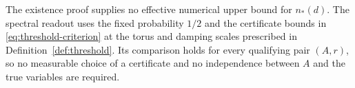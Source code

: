 The existence proof supplies no effective numerical upper bound for
$n_*(d)$. The spectral readout uses the fixed probability
$1/2$ and the certificate bounds in \eqref{eq:threshold-criterion} at the
torus and damping scales prescribed in Definition~\ref{def:threshold}.
Its comparison holds for every
qualifying pair $(A,r)$, so no measurable choice of a certificate and
no independence between $A$ and the true variables are required.
